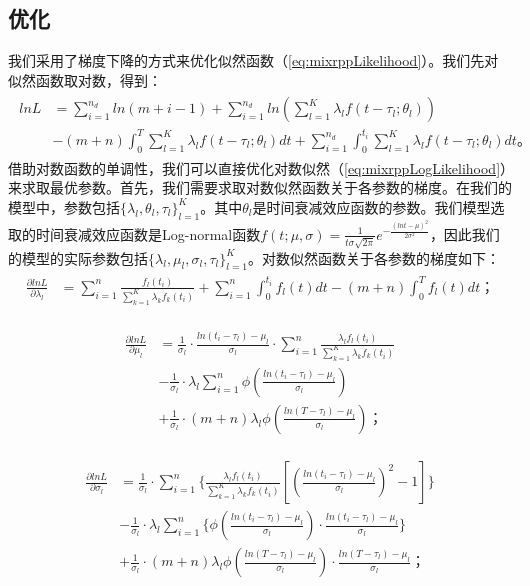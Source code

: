 \subsection{优化}
我们采用了梯度下降的方式来优化似然函数（\ref{eq:mixrppLikelihood}）。我们先对似然函数取对数，得到：
\begin{eqnarray}
\label{eq:mixrppLogLikelihood}
\begin{split}
lnL & =\sum_{i=1}^{n_d}ln(m+i-1)+\sum_{i=1}^{n_d}ln(\sum_{l=1}^K\lambda_l f(t-\tau_l;\theta_l)) \\
& - (m+n)\int_{0}^{T}\sum_{l=1}^{K}\lambda_l f(t-\tau_l;\theta_l)dt+\sum_{i=1}^{n_d}\int_{0}^{t_i}\sum_{l=1}^{K}\lambda_l f(t-\tau_l;\theta_l)dt\text{。}
\end{split}
\end{eqnarray}
借助对数函数的单调性，我们可以直接优化对数似然（\ref{eq:mixrppLogLikelihood}）来求取最优参数。首先，我们需要求取对数似然函数关于各参数的梯度。在我们的模型中，参数包括$\{\lambda_l,\theta_l,\tau_l\}_{l=1}^{K}$。其中$\theta_l$是时间衰减效应函数的参数。我们模型选取的时间衰减效应函数是Log-normal函数$f(t;\mu,\sigma)=\frac{1}{t\sigma \sqrt{2\pi}}e^{-\frac{(lnt-\mu)^2}{2\sigma^2}}$，因此我们的模型的实际参数包括$\{\lambda_l,\mu_l,\sigma_l,\tau_l\}_{l=1}^{K}$。对数似然函数关于各参数的梯度如下：
\begin{eqnarray}
\label{eq:gradLambda}
\begin{split}
\frac{\partial lnL}{\partial \lambda_l} & = \sum_{i=1}^{n}\frac{f_l(t_i)}{\sum_{k=1}^{K} \lambda_k f_k(t_i)} + \sum_{i=1}^{n} \int_{0}^{t_i}f_l(t)dt - (m+n)\int_{0}^{T}f_l(t)dt\text{；}
\end{split}
\end{eqnarray}

\begin{eqnarray}
\label{eq:gradMu}
\begin{split}
\frac{\partial lnL}{\partial \mu_l} & = \frac{1}{\sigma_l} \cdot \frac{ln(t_i-\tau_l)-\mu_l}{\sigma_l} \cdot \sum_{i=1}^{n}\frac{\lambda_l f_l(t_i)}{\sum_{k=1}^{K} \lambda_k f_k(t_i)} \\
& - \frac{1}{\sigma_l} \cdot\lambda_l \sum_{i=1}^{n} \phi(\frac{ln(t_i-\tau_l)-\mu_l}{\sigma_l}) \\
& + \frac{1}{\sigma_l}\cdot (m+n)\lambda_l \phi(\frac{ln(T-\tau_l)-\mu_l}{\sigma_l})\text{；}
\end{split}
\end{eqnarray}

\begin{eqnarray}
\label{eq:gradSigma}
\begin{split}
\frac{\partial lnL}{\partial \sigma_l} & = \frac{1}{\sigma_l} \cdot \sum_{i=1}^{n}\{\frac{\lambda_l f_l(t_i)}{\sum_{k=1}^{K} \lambda_k f_k(t_i)}[(\frac{ln(t_i-\tau_l)-\mu_l}{\sigma_l})^2-1]\} \\
& -\frac{1}{\sigma_l} \cdot \lambda_l\sum_{i=1}^{n}\{\phi(\frac{ln(t_i-\tau_l)-\mu_l}{\sigma_l}) \cdot \frac{ln(t_i-\tau_l)-\mu_l}{\sigma_l}\} \\
& + \frac{1}{\sigma_l} \cdot (m+n)\lambda_l \phi(\frac{ln(T-\tau_l)-\mu_l}{\sigma_l}) \cdot \frac{ln(T-\tau_l)-\mu_l}{\sigma_l}\text{；}
\end{split}
\end{eqnarray}

